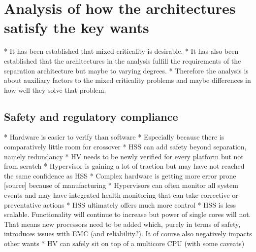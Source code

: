 
\chapter{Analysis of how the architectures satisfy the key wants} %

\label{Chapter4} %


\newcommand{\keyword}[1]{\textbf{#1}}
\newcommand{\tabhead}[1]{\textbf{#1}}
\newcommand{\code}[1]{\texttt{#1}}
\newcommand{\file}[1]{\texttt{\bfseries#1}}
\newcommand{\option}[1]{\texttt{\itshape#1}}

* It has been established that mixed criticality is desirable.
* It has also been established that the architectures in the analysis fulfill the requirements of the separation architecture but maybe to varying degrees. 
* Therefore the analysis is about auxiliary factors to the mixed criticality problems and maybe differences in how well they solve that problem. 

\section{Safety and regulatory compliance}
* Hardware is easier to verify than software
    * Especially because there is comparatively little room for crossover
* HSS can add safety beyond separation, namely redundancy 
* HV needs to be newly verified for every platform but not from scratch
* Hypervisor is gaining a lot of traction but may have not reached the same confidence as HSS
* Complex hardware  is getting more error prone [source] because of manufacturing
* Hypervisors can often monitor all system events and may have integrated health monitoring that can take corrective or preventative actions
* HSS ultimately offers much more control
* HSS is less scalable. Functionality will continue to increase but power of single cores will not. That means new processors need to be added which, purely in terms of safety, introduces issues with EMC (and reliability?). It of course also negatively impacts other wants 
* HV can safely sit on top of a multicore CPU (with some caveats)

